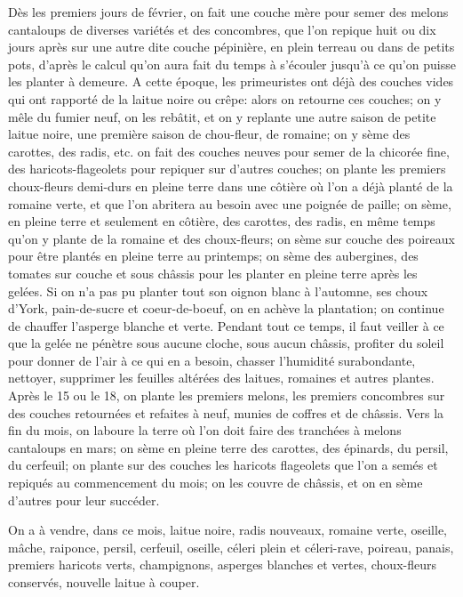 \documentclass[10pt,a4paper]{book}
\begin{document}
Dès les premiers jours de février, on fait une couche mère pour semer des melons cantaloups de diverses variétés et des concombres, que l'on repique huit ou dix jours après sur une autre dite couche pépinière, en plein terreau ou dans de petits pots, d'après le calcul qu'on aura fait du temps à s'écouler jusqu'à ce qu'on puisse les planter à demeure. A cette époque, les primeuristes ont déjà des couches vides qui ont rapporté de la laitue noire ou crêpe: alors on retourne ces couches; on y mêle du fumier neuf, on les rebâtit, et on y replante une autre saison de petite laitue noire, une première saison de chou-fleur, de romaine; on y sème des carottes, des radis, etc. on fait des couches neuves pour semer de la chicorée fine, des haricots-flageolets pour repiquer sur d'autres couches; on plante les premiers choux-fleurs demi-durs en pleine terre dans une côtière où l'on a déjà planté de la romaine verte, et que l'on abritera au besoin avec une poignée de paille; on sème, en pleine terre et seulement en côtière, des carottes, des radis, en même temps qu'on y plante de la romaine et des choux-fleurs; on sème sur couche des poireaux pour être plantés en pleine terre au printemps; on sème des aubergines, des tomates sur couche et sous châssis pour les planter en pleine terre après les gelées. Si on n'a pas pu planter tout son oignon blanc à l'automne, ses choux d'York, pain-de-sucre et coeur-de-boeuf, on en achève la plantation; on continue de chauffer l'asperge blanche et verte. Pendant tout ce temps, il faut veiller à ce que la gelée ne pénètre sous aucune cloche, sous aucun châssis, profiter du soleil pour donner de l'air à ce qui en a besoin, chasser l'humidité surabondante, nettoyer, supprimer les feuilles altérées des laitues, romaines et autres plantes. Après le 15 ou le 18, on plante les premiers melons, les premiers concombres sur des couches retournées et refaites à neuf, munies de coffres et de châssis. Vers la fin du mois, on laboure la terre où l'on doit faire des tranchées à melons cantaloups en mars; on sème en pleine terre des carottes, des épinards, du persil, du cerfeuil; on plante sur des couches les haricots flageolets que l'on a semés et repiqués au commencement du mois; on les couvre de châssis, et on en sème d'autres pour leur succéder.

On a à vendre, dans ce mois, laitue noire, radis nouveaux, romaine verte, oseille, mâche, raiponce, persil, cerfeuil, oseille, céleri plein et céleri-rave, poireau, panais, premiers haricots verts, champignons, asperges blanches et vertes, choux-fleurs conservés, nouvelle laitue à couper.
\end{document}
